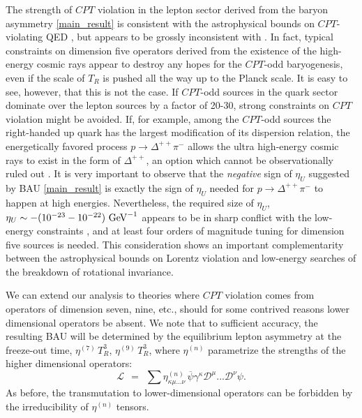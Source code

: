 \documentclass[12pt]{revtex4}
\newcommand{\mc}[1]{\mathcal{#1}}
\newcommand{\md}{\mathcal{D}}
\newcommand{\ov}{\overline}
\newcommand{\GeV}{{\rm GeV}}
\begin{document}
The strength of $CPT$ violation in the lepton sector 
derived from the baryon asymmetry \eqref{main_result} is consistent with the astrophysical bounds on 
$CPT$-violating QED \cite{Jacobson:2005bg}, but appears to be grossly inconsistent with \cite{Gagnon:2004xh}.
In fact, typical constraints on dimension five operators \cite{Gagnon:2004xh} derived from the existence of 
the high-energy cosmic rays appear to destroy any hopes for the $CPT$-odd baryogenesis, even if the 
scale of $T_R$ is pushed all the way up to the Planck scale.  It is easy to see, however, that this is 
not the case. If  $CPT$-odd sources in the quark sector dominate over the lepton sources by a factor of 
20-30, strong constraints on $CPT$ violation might be avoided. If, for example, among the 
$CPT$-odd sources the right-handed up quark has the largest modification of its dispersion relation, 
the energetically favored process $p\to \Delta^{++}\pi^-$ allows the ultra high-energy cosmic rays to exist in the 
form of $\Delta^{++}$, an option which cannot be observationally ruled out \cite{Gagnon:2004xh}. 
It is very important to observe that 
the {\em negative} sign of $\eta_U$ suggested by BAU \eqref{main_result} is exactly the sign of $\eta_U$ 
needed for $p\to \Delta^{++}\pi^-$ to happen at high energies.  
Nevertheless, the required size of $\eta_U$, $\eta_U \sim - (10^{-23}-10^{-22})~\GeV^{-1}$
appears to be in sharp conflict with the low-energy constraints \cite{Sudarsky:2002ue,MP:}, and at least 
four orders of magnitude tuning for dimension five sources is needed. 
This consideration shows an important complementarity between the
astrophysical bounds on Lorentz violation and low-energy searches of the breakdown of rotational 
invariance. 


We can extend our analysis to theories where $CPT$ violation comes from operators of dimension 
seven, nine, etc., should for some contrived reasons lower dimensional operators be absent. 
	We note that to sufficient accuracy, the resulting BAU
	will be determined by the equilibrium lepton asymmetry
	at the freeze-out time, $ \eta^{(7)}\,T_R^3 $, $ \eta^{(9)}\,T_R^3 $, 
	where $\eta^{(n)}$ parametrize the strengths of the higher dimensional operators:
\[
	\mc{L} ~~=~~ \sum \eta^{(n)}_{\kappa\mu...\nu}\,
	\ov{\psi} \gamma^\kappa \md^\mu ...\md^\nu  \psi.
\]
As before, the transmutation to lower-dimensional operators can be forbidden 
by the irreducibility of $\eta^{(n)}$ tensors. 
\end{document}
